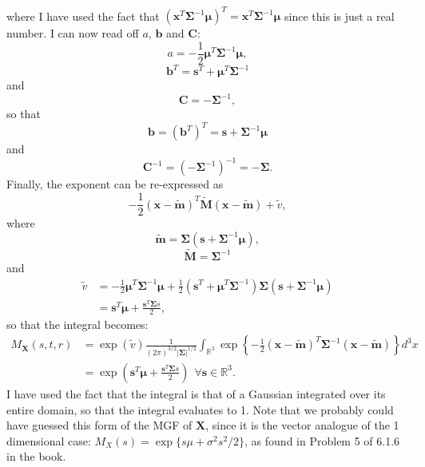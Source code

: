 \begin{problem}{16}
\begin{align*}
\end{align*}
where I have used the fact that $(\bm x^T \bm \Sigma^{-1}\bm \mu )^T=\bm x^T \bm \Sigma^{-1}\bm \mu$ since this is just a real number.  I can now read off $a$, $\bm b$ and $\bm C$:
\begin{equation*}
a = -\frac{1}{2} \bm \mu^T \bm \Sigma^{-1}\bm \mu,
\end{equation*}
\begin{equation*}
\bm b^T = \bm s^T+ \bm \mu^T \bm \Sigma^{-1}
\end{equation*}
and 
\begin{equation*}
\bm C = -\bm \Sigma^{-1},
\end{equation*}
so that 
\begin{equation*}
\bm b =(\bm b ^T)^T =\bm s + \bm \Sigma^{-1} \bm \mu
\end{equation*}
and 
\begin{equation*}
\bm C^{-1} = \left( -{\bm  \Sigma^{-1}}\right)^{-1}=-\bm \Sigma .
\end{equation*} 
Finally, the exponent can be re-expressed as
\begin{equation*}
-\frac{1}{2}({\bm x}-{\bm{\tilde m}})^T \bm {\tilde M }({\bm x}-{{\bm{\tilde m}}})+\tilde v,
\end{equation*}
where 
\begin{equation*}
\bm{\tilde m} = \bm \Sigma(\bm s+\bm \Sigma^{-1}\bm \mu),
\end{equation*}
\begin{equation*}
\bm{\tilde M} = \bm \Sigma^{-1}
\end{equation*}
and
\begin{align*}
\tilde v &= -\frac{1}{2} \bm \mu^T \bm \Sigma^{-1}\bm \mu +\frac{1}{2}(\bm s^T+ \bm \mu^T \bm \Sigma^{-1}) \bm \Sigma (\bm s + \bm \Sigma^{-1} \bm \mu) \\
& =\bm s^T \bm \mu +\frac{\bm s^T \bm \Sigma s}{2},
\end{align*}
so that the integral becomes:
\begin{align*}
M_{\bm X}(s, t, r) &= \exp ( \tilde v) \frac{1}{(2 \pi)^{3/2} | \bm \Sigma |^{1/2}} \int_{\mathbb R^3}  \exp \left \{ -\frac{1}{2}({\bm x}-{\bm{\tilde m}})^T \bm \Sigma^{-1}({\bm x}-{{\bm{\tilde m}}})\right \}d^3x \\
&=\exp \left ( \bm s^T \bm \mu +\frac{\bm s^T \bm \Sigma s}{2} \right ) ~~ \forall \bm s \in \mathbb R^3.
\end{align*}
I have used the fact that the integral is that of a Gaussian integrated over its entire domain, so that the integral evaluates to 1.  Note that we probably could have guessed this form of the MGF of $\bm X$, since it is the vector analogue of the 1 dimensional case: $M_X(s) = \exp \{s\mu +\sigma^2 s^2/2 \}$, as found in Problem 5 of 6.1.6 in the book.


\end{problem}
